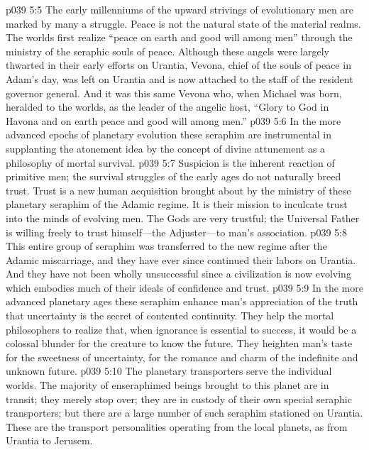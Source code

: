 \pc \vs p039 5:5 \bibnobreakspace {} The early millenniums of the upward strivings of evolutionary men are marked by many a struggle. Peace is not the natural state of the material realms. The worlds first realize “peace on earth and good will among men” through the ministry of the seraphic souls of peace. Although these angels were largely thwarted in their early efforts on Urantia, Vevona, chief of the souls of peace in Adam’s day, was left on Urantia and is now attached to the staff of the resident governor general. And it was this same Vevona who, when Michael was born, heralded to the worlds, as the leader of the angelic host, “Glory to God in Havona and on earth peace and good will among men.”
\vs p039 5:6 In the more advanced epochs of planetary evolution these seraphim are instrumental in supplanting the atonement idea by the concept of divine attunement as a philosophy of mortal survival.
\pc \vs p039 5:7 \bibnobreakspace {} Suspicion is the inherent reaction of primitive men; the survival struggles of the early ages do not naturally breed trust. Trust is a new human acquisition brought about by the ministry of these planetary seraphim of the Adamic regime. It is their mission to inculcate trust into the minds of evolving men. The Gods are very trustful; the Universal Father is willing freely to trust himself---the Adjuster---to man’s association.
\vs p039 5:8 This entire group of seraphim was transferred to the new regime after the Adamic miscarriage, and they have ever since continued their labors on Urantia. And they have not been wholly unsuccessful since a civilization is now evolving which embodies much of their ideals of confidence and trust.
\vs p039 5:9 In the more advanced planetary ages these seraphim enhance man’s appreciation of the truth that uncertainty is the secret of contented continuity. They help the mortal philosophers to realize that, when ignorance is essential to success, it would be a colossal blunder for the creature to know the future. They heighten man’s taste for the sweetness of uncertainty, for the romance and charm of the indefinite and unknown future.
\pc \vs p039 5:10 \bibnobreakspace {} The planetary transporters serve the individual worlds. The majority of enseraphimed beings brought to this planet are in transit; they merely stop over; they are in custody of their own special seraphic transporters; but there are a large number of such seraphim stationed on Urantia. These are the transport personalities operating from the local planets, as from Urantia to Jerusem.
